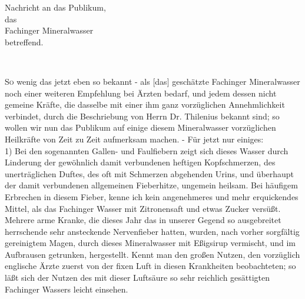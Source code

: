 \documentclass[11pt,a5paper,twoside]{memoir}
\begin{document}
\newpage
\fancyhead[C]{=\kern-0.14em=\kern-0.14em=\kern-0.14em=\kern-0.14em= \thepage\kern+0.14em =\kern-0.14em=\kern-0.14em=\kern-0.14em=\kern-0.14em=}
{\centering
    {\Large Nachricht an das Publikum,}\\
    {\small das}\\
    \vspace{.5em}
    {\LARGE Fachinger Mineralwasser}\\
    {\small betreffend.}\\

    \begin{center}\begin{minipage}{4cm}
      \centering
      \hrulefill\\
    \end{minipage}\end{center}
}

\lettrine{S}o wenig das jetzt eben so bekannt -
als [das] geschätzte Fachinger Mineralwasser
noch einer weiteren Empfehlung bei Ärzten bedarf,
und jedem dessen nicht gemeine Kräfte,
die dasselbe mit einer ihm ganz vorzüglichen Annehmlichkeit verbindet,
durch die Beschriebung von Herrn Dr. Thilenius bekannt sind;
so wollen wir nun das Publikum
auf einige diesem Mineralwasser vorzüglichen Heilkräfte
von Zeit zu Zeit aufmerksam machen. -
Für jetzt nur einiges:\\

1) Bei den sogenannten Gallen- und Faulfiebern
zeigt sich dieses Wasser durch Linderung
der gewöhnlich damit verbundenen heftigen Kopfschmerzen,
des unerträglichen Duftes,
des oft mit Schmerzen abgehenden Urins,
und überhaupt der damit verbundenen allgemeinen Fieberhitze,
ungemein heilsam.
Bei häufigem Erbrechen in diesem Fieber,
kenne ich kein angenehmeres und mehr erquickendes Mittel,
als das Fachinger Wasser mit Zitronensaft und etwas Zucker versüßt.
Mehrere arme Kranke,
die dieses Jahr das in unserer Gegend
so ausgebreitet herrschende sehr ansteckende Nervenfieber hatten,
wurden, nach vorher sorgfältig gereinigtem Magen,
durch dieses Mineralwasser mit Eßigsirup vermischt,
und im Aufbrausen%
getrunken, hergestellt.
Kennt man den großen Nutzen,
den vorzüglich englische Ärzte
zuerst von der fixen Luft in diesen Krankheiten beobachteten;
so läßt sich der Nutzen
des mit dieser Luftsäure so sehr reichlich gesättigten Fachinger Wassers
leicht einsehen.\\
\end{document}
